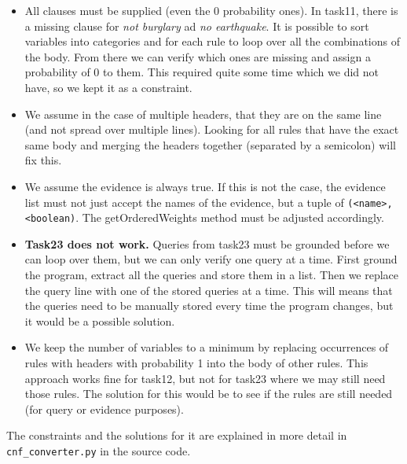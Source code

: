\begin{itemize}
\item All clauses must be supplied (even the 0 probability ones). In task11, there is a missing clause for \textit{not burglary} ad \textit{no earthquake}. It is possible to sort variables into categories and for each rule to loop over all the combinations of the body. From there we can verify which ones are missing and assign a probability of 0 to them. This required quite some time which we did not have, so we kept it as a constraint.
\item We assume in the case of multiple headers, that they are on the same line (and not spread over multiple lines). Looking for all rules that have the exact same body and merging the headers together (separated by a semicolon) will fix this.
\item We assume the evidence is always true. If this is not the case, the evidence list must not just accept the names of the evidence, but a tuple of \verb|(<name>,<boolean)|. The getOrderedWeights method must be adjusted accordingly.
\item \textbf{Task23 does not work.}  Queries from task23 must be grounded before we can loop over them, but we can only verify one query at a time.  First ground the program, extract all the queries and store them in a list. Then we replace the query line with one of the stored queries at a time. This will means that the queries need to be manually stored every time the program changes, but it would be a possible solution.
\item We keep the number of variables to a minimum by replacing occurrences of rules with headers with probability 1 into the body of other rules. This approach works fine for task12, but not for task23 where we may still need those rules. The solution for this would be to see if the rules are still needed (for query or evidence purposes). 
\end{itemize}

The constraints and the solutions for it are explained in more detail in \texttt{cnf\_converter.py} in the source code.


